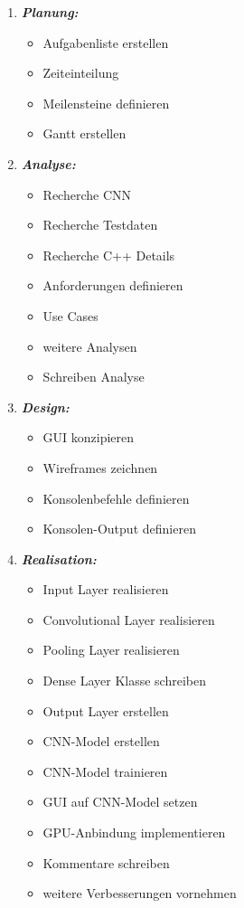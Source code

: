 \begin{enumerate} 
	\item \textbf{\emph{Planung:}} 
	\begin{itemize} 
		\item Aufgabenliste erstellen
		\item Zeiteinteilung 
		\item Meilensteine definieren 
		\item Gantt erstellen 
	\end{itemize} 
	\item \textbf{\emph{Analyse:}} 
	\begin{itemize} 
		\item Recherche CNN 
		\item Recherche Testdaten 
		\item Recherche C++ Details 
		\item Anforderungen definieren 
		\item Use Cases 
		\item weitere Analysen 
		\item Schreiben Analyse 
	\end{itemize} 
	\item \textbf{\emph{Design:}} 
	\begin{itemize} 
		\item GUI konzipieren 
		\item Wireframes zeichnen 
		\item Konsolenbefehle definieren 
		\item Konsolen-Output definieren 
	\end{itemize}
	\item \textbf{\emph{Realisation:}} 
	\begin{itemize} 
		\item Input Layer realisieren 
		\item Convolutional Layer realisieren 
		\item Pooling Layer realisieren 
		\item Dense Layer Klasse schreiben 
		\item Output Layer erstellen 
		\item CNN-Model erstellen 
		\item CNN-Model trainieren 
		\item GUI auf CNN-Model setzen 
		\item GPU-Anbindung implementieren 
		\item Kommentare schreiben 
		\item weitere Verbesserungen vornehmen 

\end{itemize}
\end{enumerate}
